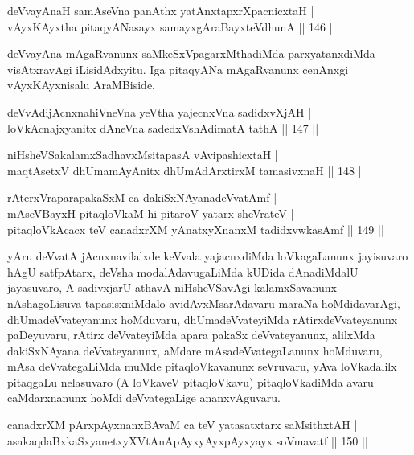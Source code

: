 \begin{shl}
deVvayAnaH samAseVna panAthx yatAnxtapxrXpacnicxtaH | \\
vAyxKAyx\s tha pitaqyANasayx samayxgAraBayxteV\s dhunA \hfill|| 146 || 
\end{shl}

\begin{artha}
deVvayAna mAgaRvanunx saMkeSxVpagarxMthadiMda parxyatanxdiMda
visAtxravAgi iLisidAdxyitu. Iga pitaqyANa mAgaRvanunx cenAnxgi
vAyxKAyxnisalu AraMBiside.
\end{artha}

\begin{shl}
deVvAdijAcnxnahiVneVna yeV\s tha yajecnxVna sadidxvXjAH | \\
loVkAcnajxyanitx dAneVna sadedxVshAdimatA tathA \hfill|| 147 || 
\end{shl}

\begin{shl}
niHsheVSakalamxSadhavxMsitapasA vA\s vipashicxtaH | \\
maqtAsetxV dhUmamAyAnitx dhUmAdArxtirxM tamasivxnaH \hfill|| 148 || 
\end{shl}

\begin{shl}
rAterxVraparapakaSxM ca dakiSxNAyanadeVvatAmf | \\
mAseVBayxH pitaqloVkaM hi pitaroV yatarx sheVrateV | \\
pitaqloVkAcacx teV canadxrXM yAnatxyXnanxM tadidxvwkasAmf \hfill|| 149 || 
\end{shl}

\begin{artha}
yAru deVvatA jAcnxnavilalxde keVvala yajacnxdiMda loVkagaLanunx
jayisuvaro hAgU satfpAtarx, deVsha modalAdavugaLiMda kUDida
dAnadiMdalU jayasuvaro, A sadivxjarU athavA niHsheVSavAgi
kalamxSavanunx nAshagoLisuva tapasisxniMdalo avidAvxMsarAdavaru maraNa
hoMdidavarAgi, dhUmadeVvateyanunx hoMduvaru, dhUmadeVvateyiMda
rAtirxdeVvateyanunx paDeyuvaru, rAtirx deVvateyiMda apara pakaSx
deVvateyanunx, alilxMda dakiSxNAyana deVvateyanunx, aMdare
mAsadeVvategaLanunx hoMduvaru, mAsa deVvategaLiMda muMde
pitaqloVkavanunx seVruvaru, yAva loVkadalilx pitaqgaLu nelasuvaro
(A loVkaveV pitaqloVkavu) pitaqloVkadiMda avaru caMdarxnanunx hoMdi
deVvategaLige ananxvAguvaru.
\end{artha}


\begin{shl}
canadxrXM pArxpAyxnanxBAvaM ca teV yatasatxtarx saMsithxtAH | \\
asakaqdaBxkaSxyanetxyXVtAnApAyxyAyx\s \s pAyxyayx soVmavatf \hfill|| 150 || 
\end{shl}

